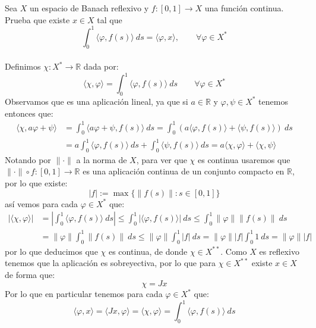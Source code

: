 \documentclass[12pt]{article}
\begin{document}
    \begin{ejercicio}
        Sea $X$ un espacio de Banach reflexivo y $f:[0,1]\to X$ una función continua. Prueba que existe $x\in X$ tal que
        \begin{equation*}
            \int_{0}^{1} \langle \varphi,f(s) \rangle ~ds  = \langle \varphi,x \rangle , \qquad \forall \varphi \in X^\ast
        \end{equation*}~\\

        \noindent
        Definimos $\chi:X^\ast\to \mathbb{R}$ dada por:
        \begin{equation*}
            \langle \chi,\varphi \rangle  = \int_{0}^{1} \langle \varphi,f(s) \rangle ~ds  \qquad \forall \varphi \in X^\ast
        \end{equation*}
        Observamos que es una aplicación lineal, ya que si $a\in \mathbb{R}$ y $\varphi,\psi\in X^\ast$ tenemos entonces que:
        \begin{align*}
            \langle \chi, a\varphi + \psi \rangle  &= \int_{0}^{1} \langle a\varphi + \psi,f(s) \rangle ~ds  = \int_{0}^{1}\left( a\langle \varphi,f(s) \rangle +\langle \psi,f(s) \rangle \right)~ds  \\
                                                   &= a\int_{0}^{1} \langle \varphi,f(s) \rangle ~ds  + \int_{0}^{1} \langle \psi,f(s) \rangle ~ds  = a\langle \chi,\varphi \rangle  + \langle \chi,\psi \rangle 
        \end{align*}
        Notando por $\|\cdot \|$ a la norma de $X$, para ver que $\chi$ es continua usaremos que $\|\cdot \|\circ f:[0,1]\to \mathbb{R}$ es una aplicación continua de un conjunto compacto en $\mathbb{R}$, por lo que existe:
        \begin{equation*}
            |f| := \max\{\|f(s)\|:s\in [0,1]\}
        \end{equation*}
        así vemos para cada $\varphi \in X^\ast$ que:
        \begin{align*}
            |\langle \chi,\varphi \rangle | &= \left|\int_{0}^{1} \langle \varphi,f(s) \rangle ~ds \right| \leq \int_{0}^{1} |\langle \varphi,f(s) \rangle |~ds  \leq \int_{0}^{1} \|\varphi\|\|f(s)\|~ds \\ &= \|\varphi\|\int_{0}^{1} \|f(s)\|~ds \leq \|\varphi\|\int_{0}^{1} |f|~ds  = \|\varphi\||f|\int_{0}^{1} 1~ds = \|\varphi\||f|
        \end{align*}
        por lo que deducimos que $\chi$ es continua, de donde $\chi \in X^{\ast\ast}$. Como $X$ es reflexivo tenemos que la aplicación
        es sobreyectiva, por lo que para $\chi \in X^{\ast\ast}$ existe $x\in X$ de forma que:
        \begin{equation*}
            \chi = Jx
        \end{equation*}
        Por lo que en particular tenemos para cada $\varphi \in X^\ast$ que:
        \begin{equation*}
            \langle \varphi,x \rangle  = \langle Jx,\varphi \rangle  = \langle \chi,\varphi \rangle  = \int_{0}^{1} \langle \varphi,f(s) \rangle ~ds 
        \end{equation*}
    \end{ejercicio}
\end{document}
